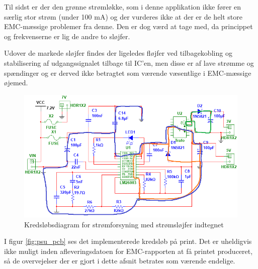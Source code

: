 Til sidst er der den grønne strømløkke, som i denne applikation ikke fører en særlig stor strøm (under 100 mA) og der vurderes ikke at der er de helt store EMC-mæssige problemer fra denne. 
Den er dog værd at tage med, da princippet og frekvenserne er lig de andre to sløjfer.

Udover de markede sløjfer findes der ligeledes fløjfer ved tilbagekobling og stabilisering af udgangssignalet tilbage til IC'en, men disse er af lave strømme og spændinger og er derved ikke betragtet som værende væsentlige i EMC-mæssige øjemed.

\clearpage

\begin{landscape}
\begin{figure}[h]
\centering
\includegraphics[height=\textwidth -3.2 cm]{../fig/diagrammer/bil/psu_kredsloeb_EMC}
\caption{Kredsløbsdiagram for strømforsyning med strømsløjfer indtegnet}
\label{fig:psu_kredsloeb_EMC}
\end{figure}
\end{landscape}

\clearpage

I figur \ref{fig:psu_pcb} ses det implementerede kredsløb på print.
Det er uheldigvis ikke muligt inden afleveringsdatoen for EMC-rapporten at få printet produceret, så de overvejelser der er gjort i dette afsnit betrates som værende endelige.

